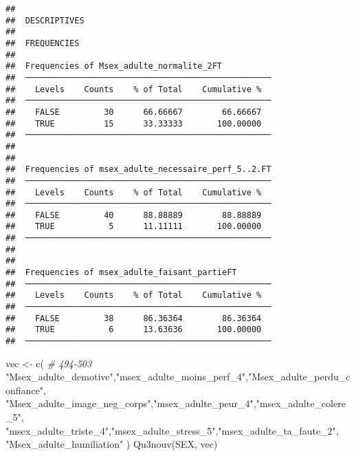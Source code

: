 \documentclass[
]{article}
\newenvironment{Shaded}{\begin{snugshade}}{\end{snugshade}}
\newcommand{\CommentTok}[1]{\textcolor[rgb]{0.56,0.35,0.01}{\textit{#1}}}
\newcommand{\FunctionTok}[1]{\textcolor[rgb]{0.00,0.00,0.00}{#1}}
\newcommand{\NormalTok}[1]{#1}
\newcommand{\OtherTok}[1]{\textcolor[rgb]{0.56,0.35,0.01}{#1}}
\newcommand{\StringTok}[1]{\textcolor[rgb]{0.31,0.60,0.02}{#1}}
\begin{document}
\begin{verbatim}
## 
##  DESCRIPTIVES
## 
##  FREQUENCIES
## 
##  Frequencies of Msex_adulte_normalite_2FT           
##  ────────────────────────────────────────────────── 
##    Levels    Counts    % of Total    Cumulative %   
##  ────────────────────────────────────────────────── 
##    FALSE         30      66.66667        66.66667   
##    TRUE          15      33.33333       100.00000   
##  ────────────────────────────────────────────────── 
## 
## 
##  Frequencies of msex_adulte_necessaire_perf_5..2.FT 
##  ────────────────────────────────────────────────── 
##    Levels    Counts    % of Total    Cumulative %   
##  ────────────────────────────────────────────────── 
##    FALSE         40      88.88889        88.88889   
##    TRUE           5      11.11111       100.00000   
##  ────────────────────────────────────────────────── 
## 
## 
##  Frequencies of msex_adulte_faisant_partieFT        
##  ────────────────────────────────────────────────── 
##    Levels    Counts    % of Total    Cumulative %   
##  ────────────────────────────────────────────────── 
##    FALSE         38      86.36364        86.36364   
##    TRUE           6      13.63636       100.00000   
##  ──────────────────────────────────────────────────
\end{verbatim}

\begin{Shaded}
\begin{Highlighting}[]
\NormalTok{vec }\OtherTok{\textless{}{-}} \FunctionTok{c}\NormalTok{(  }\CommentTok{\# 494{-}503}
  \StringTok{"Msex\_adulte\_demotive"}\NormalTok{,}\StringTok{"msex\_adulte\_moins\_perf\_4"}\NormalTok{,}\StringTok{"Msex\_adulte\_perdu\_confiance"}\NormalTok{,}
  \StringTok{"Msex\_adulte\_image\_neg\_corps"}\NormalTok{,}\StringTok{"msex\_adulte\_peur\_4"}\NormalTok{,}\StringTok{"msex\_adulte\_colere\_5"}\NormalTok{,}
  \StringTok{"msex\_adulte\_triste\_4"}\NormalTok{,}\StringTok{"msex\_adulte\_stress\_5"}\NormalTok{,}\StringTok{"msex\_adulte\_ta\_faute\_2"}\NormalTok{,}
  \StringTok{"Msex\_adulte\_humiliation"}
\NormalTok{  )}
\FunctionTok{Qu3nouv}\NormalTok{(SEX, vec)}
\end{Highlighting}
\end{Shaded}
\end{document}
